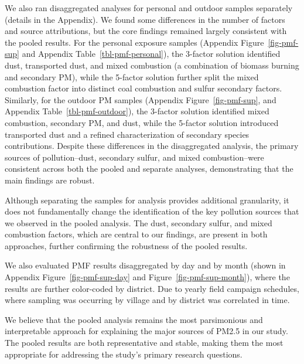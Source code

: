 \documentclass[
  letterpaper,
  DIV=11,
  numbers=noendperiod]{scrartcl}
\begin{document}
We also ran disaggregated analyses  for personal and
outdoor samples separately (details in the Appendix). We found some
differences in the number of factors and source attributions, but the
core findings remained largely consistent with the pooled results. For
the personal exposure samples (Appendix Figure~\ref{fig-pmf-sup} and
Appendix Table~\ref{tbl-pmf-personal}), the 3-factor solution identified
dust, transported dust, and mixed combustion (a combination of biomass
burning and secondary PM), while the 5-factor solution further split the
mixed combustion factor into distinct coal combustion and sulfur
secondary factors. Similarly, for the outdoor PM samples (Appendix
Figure~\ref{fig-pmf-sup}, and Appendix Table~\ref{tbl-pmf-outdoor}), the
3-factor solution identified mixed combustion, secondary PM, and dust,
while the 5-factor solution introduced transported dust and a refined
characterization of secondary species contributions. Despite these
differences in the disaggregated analysis, the primary sources of
pollution--dust, secondary sulfur, and mixed combustion--were consistent
across both the pooled and separate analyses, demonstrating that the
main findings are robust.

Although separating the samples for analysis provides additional
granularity, it does not fundamentally change the identification of the
key pollution sources that we observed in the pooled analysis. The dust,
secondary sulfur, and mixed combustion factors, which are central to our
findings, are present in both approaches, further confirming the
robustness of the pooled results.

We also evaluated PMF results disaggregated  by day and
by month (shown in Appendix Figure~\ref{fig-pmf-sup-day} and
Figure~\ref{fig-pmf-sup-month}), where the results are further
color-coded by district. Due to yearly field campaign schedules, where
sampling was occurring by village and by district was correlated in
time.

We believe that the pooled analysis remains the most parsimonious and
interpretable approach for explaining the major sources of PM2.5 in our
study. The pooled results are both representative and stable, making
them the most appropriate for addressing the study's primary research
questions.
\end{document}
